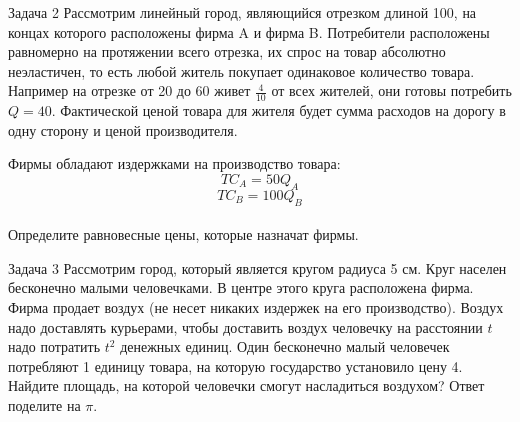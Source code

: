 \begin{mybox}{Задача 2}
    \indent\setlength{\parindent}{1em}\indent\setlength{\parindent}{1em}Рассмотрим линейный город, являющийся отрезком
    длиной 100, на концах которого расположены фирма A и фирма B. Потребители расположены равномерно на протяжении всего
    отрезка, их спрос на товар абсолютно неэластичен, то есть любой житель покупает одинаковое количество товара.
    Например на отрезке от 20 до 60 живет $\frac{4}{10}$ от всех жителей, они готовы потребить $Q=40$. Фактической
    ценой товара для жителя будет сумма расходов на дорогу в одну сторону и ценой производителя.
    \begin{center}
    \end{center}
    \indent\setlength{\parindent}{1em}\indent\setlength{\parindent}{1em}Фирмы обладают издержками на производство
    товара:
    $$TC_A=50Q_A$$ $$TC_B=100Q_B$$\\
    \indent\setlength{\parindent}{1em}Определите равновесные цены, которые назначат фирмы.
\end{mybox}

\begin{mybox}{Задача 3}
    \indent\setlength{\parindent}{1em}\indent\setlength{\parindent}{1em}Рассмотрим город, который является кругом
    радиуса 5 см. Круг населен бесконечно малыми человечками. В центре этого круга расположена фирма. Фирма продает
    воздух (не несет никаких издержек на его производство). Воздух надо доставлять курьерами, чтобы доставить воздух
    человечку на расстоянии $t$ надо потратить $t^2$ денежных единиц. Один бесконечно малый человечек
    потребляют 1 единицу товара, на которую государство установило цену 4. Найдите площадь, на которой человечки
    смогут насладиться воздухом? Ответ поделите на $\pi$.
\end{mybox}


